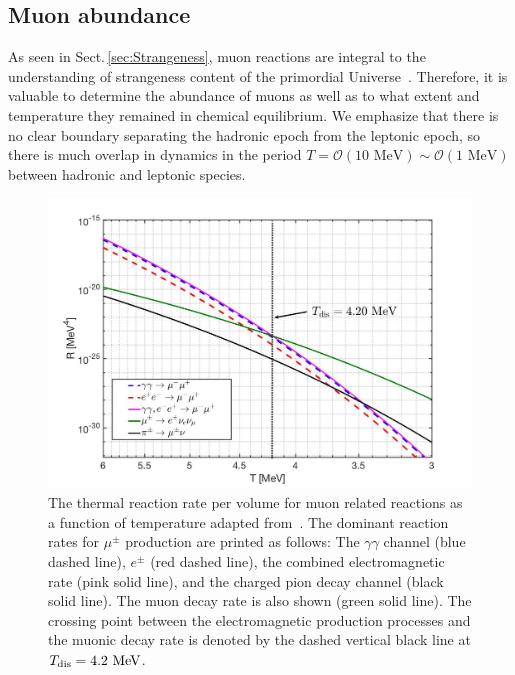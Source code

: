\documentclass[universe,article,submit,moreauthors,pdftex,a4paper]{Definitions/mdpi}
\newcommand{\MeV}{\text{ MeV}}
\newcommand*{\rsec}[1]{Sect.\,{\ref{#1}}}
\begin{document}
\subsection{Muon abundance} \label{sec:Muons}
\noindent As seen in \rsec{sec:Strangeness}, muon reactions are integral to the understanding of strangeness content of the primordial Universe~\cite{Yang:2021bko}. Therefore, it is valuable to determine the abundance of muons as well as to what extent and temperature they remained in chemical equilibrium. We emphasize that there is no clear boundary separating the hadronic epoch from the leptonic epoch, so there is much overlap in dynamics in the period $T=\mathcal{O}(10\MeV)\sim\mathcal{O}(1\MeV)$ between hadronic and leptonic species.

\begin{figure}[ht]
\centering
\includegraphics[width=0.9\columnwidth]{./plots/MuonRate_new2.jpg}
\caption{The thermal reaction rate per volume for muon related reactions as a function of temperature adapted from~\cite{Rafelski:2021aey}. The dominant reaction rates for $\mu^\pm$ production are printed as follows: The $\gamma\gamma$ channel (blue dashed line), $e^{\pm}$ (red dashed line), the combined electromagnetic rate (pink solid line), and the charged pion decay channel (black solid line). The muon decay rate is also shown (green solid line). The crossing point between the electromagnetic production processes and the muonic decay rate is denoted by the dashed vertical black line at $T_{\rm dis}=4.2\MeV$.}
\label{muon_fig} 
\end{figure}
\end{document}
